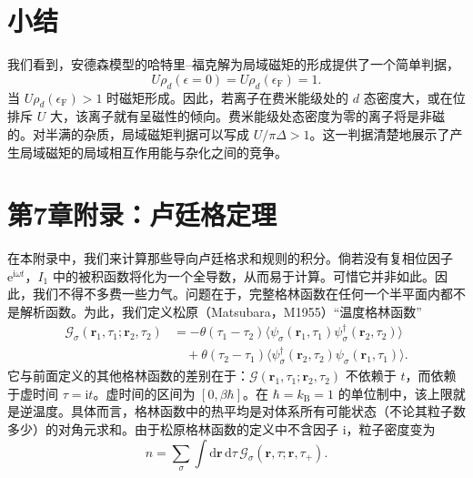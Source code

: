 \section*{小结}

我们看到，安德森模型的哈特里–福克解为局域磁矩的形成提供了一个简单判据，
\begin{equation*}
U\rho_{d}(\epsilon = 0) = U\rho_{d}(\epsilon_{\mathrm{F}}) = 1.
\tag{7.120}
\end{equation*}
当 $U\rho_{d}(\epsilon_{\mathrm{F}}) > 1$ 时磁矩形成。因此，若离子在费米能级处的 $d$ 态密度大，或在位排斥 $U$ 大，该离子就有呈磁性的倾向。费米能级处态密度为零的离子将是非磁的。对半满的杂质，局域磁矩判据可以写成 $U/\pi\Delta > 1$。这一判据清楚地展示了产生局域磁矩的局域相互作用能与杂化之间的竞争。

\section*{第7章附录：卢廷格定理}

在本附录中，我们来计算那些导向卢廷格求和规则的积分。倘若没有复相位因子 $\mathrm{e}^{\mathrm{i}\omega t}$，$I_{1}$ 中的被积函数将化为一个全导数，从而易于计算。可惜它并非如此。因此，我们不得不多费一些力气。问题在于，完整格林函数在任何一个半平面内都不是解析函数。为此，我们定义松原（Matsubara，M1955）“温度格林函数”
\begin{align*}
\mathcal{G}_{\sigma}(\mathbf{r}_{1},\tau_{1};\mathbf{r}_{2},\tau_{2}) &= -\theta(\tau_{1} - \tau_{2})\langle\psi_{\sigma}(\mathbf{r}_{1},\tau_{1})\psi^{\dagger}_{\sigma}(\mathbf{r}_{2},\tau_{2})\rangle \\
&\quad + \theta(\tau_{2} - \tau_{1})\langle\psi^{\dagger}_{\sigma}(\mathbf{r}_{2},\tau_{2})\psi_{\sigma}(\mathbf{r}_{1},\tau_{1})\rangle.
\tag{7.121}
\end{align*}
它与前面定义的其他格林函数的差别在于：$\mathcal{G}(\mathbf{r}_{1},\tau_{1};\mathbf{r}_{2},\tau_{2})$ 不依赖于 $t$，而依赖于虚时间 $\tau = \mathrm{i}t$。虚时间的区间为 $[0, \beta\hbar]$。在 $\hbar = k_{\mathrm{B}} = 1$ 的单位制中，该上限就是逆温度。具体而言，格林函数中的热平均是对体系所有可能状态（不论其粒子数多少）的对角元求和。由于松原格林函数的定义中不含因子 $\mathrm{i}$，粒子密度变为
\begin{equation*}
n = \sum_{\sigma}\int \mathrm{d}\mathbf{r}\,\mathrm{d}\tau\, \mathcal{G}_{\sigma}(\mathbf{r},\tau;\mathbf{r},\tau_{+}).
\tag{7.122}
\end{equation*}

